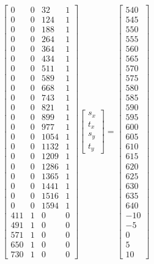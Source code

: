 \documentclass[a4paper]{article}
\begin{document}
\begin{equation}
	\begin{bmatrix}
		 0 & 0 & 32 & 1\\
		 0 & 0 & 124 & 1\\
		 0 & 0 & 188 & 1\\
		 0 & 0 & 264 & 1\\
		 0 & 0 & 364 & 1\\
		 0 & 0 & 434 & 1\\
		 0 & 0 & 511 & 1\\
		 0 & 0 & 589 & 1\\
		 0 & 0 & 668 & 1\\
		 0 & 0 & 743 & 1\\
		 0 & 0 & 821 & 1\\
		 0 & 0 & 899 & 1\\
		 0 & 0 & 977 & 1\\
		 0 & 0 & 1054 & 1\\
		 0 & 0 & 1132 & 1\\
		 0 & 0 & 1209 & 1\\
		 0 & 0 & 1286 & 1\\
		 0 & 0 & 1365 & 1\\
		 0 & 0 & 1441 & 1\\
		 0 & 0 & 1516 & 1\\
		 0 & 0 & 1594 & 1\\
		 411 & 1 & 0 & 0\\
		 491 & 1 & 0 & 0\\
		 571 & 1 & 0 & 0\\
		 650 & 1 & 0 & 0\\
		 730 & 1 & 0 & 0
	\end{bmatrix}
	\begin{bmatrix}
		s_x\\t_x\\s_y\\t_y
	\end{bmatrix}
	=
	\begin{bmatrix}
		540\\545\\550\\555\\560\\565\\570\\575\\580\\585\\590\\595\\600\\605\\610\\615\\620\\625\\630\\635\\640\\-10\\-5\\0\\5\\10
	\end{bmatrix}
\end{equation}
\end{document}
